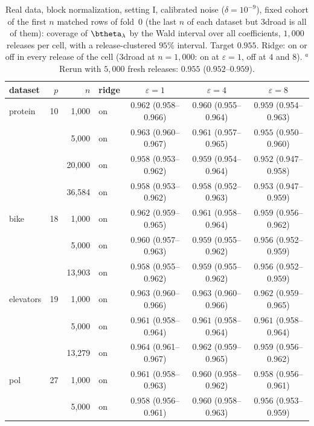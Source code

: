 \begin{table}[ht]
  \centering\small
  \caption{Real data, block normalization, setting I, calibrated noise ($\delta = 10^{-9}$), fixed cohort of the first $n$ matched rows of fold~0 (the last $n$ of each dataset but 3droad is all of them): coverage of $\btheta_\lambda$ by the Wald interval over all coefficients, $1{,}000$ releases per cell, with a release-clustered $95\%$ interval. Target $0.955$. Ridge: on or off in every release of the cell (3droad at $n = 1{,}000$: on at $\varepsilon = 1$, off at $4$ and $8$). $^{a}$Rerun with $5{,}000$ fresh releases: $0.955$ ($0.952$--$0.959$).}
  \label{tab:coverage_real}
  \footnotesize
  \setlength{\tabcolsep}{4pt}
  \begin{tabular}{@{}lrrlccc@{}}
    \toprule
    dataset & $p$ & $n$ & ridge & $\varepsilon = 1$ & $\varepsilon = 4$ & $\varepsilon = 8$ \\
    \midrule
    protein & 10 & 1{,}000 & on & $0.962$ (0.958--0.966) & $0.960$ (0.955--0.964) & $0.959$ (0.954--0.963) \\
     & & 5{,}000 & on & $0.963$ (0.960--0.967) & $0.961$ (0.957--0.965) & $0.955$ (0.950--0.960) \\
     & & 20{,}000 & on & $0.958$ (0.953--0.962) & $0.959$ (0.954--0.964) & $0.952$ (0.947--0.958) \\
     & & 36{,}584 & on & $0.958$ (0.953--0.962) & $0.958$ (0.952--0.963) & $0.953$ (0.947--0.959) \\
    \addlinespace
    bike & 18 & 1{,}000 & on & $0.962$ (0.959--0.965) & $0.961$ (0.958--0.964) & $0.959$ (0.956--0.962) \\
     & & 5{,}000 & on & $0.960$ (0.957--0.963) & $0.959$ (0.955--0.962) & $0.956$ (0.952--0.959) \\
     & & 13{,}903 & on & $0.958$ (0.955--0.962) & $0.959$ (0.955--0.962) & $0.956$ (0.952--0.959) \\
    \addlinespace
    elevators & 19 & 1{,}000 & on & $0.963$ (0.960--0.966) & $0.963$ (0.960--0.966) & $0.962$ (0.959--0.965) \\
     & & 5{,}000 & on & $0.961$ (0.958--0.964) & $0.961$ (0.958--0.964) & $0.961$ (0.958--0.964) \\
     & & 13{,}279 & on & $0.964$ (0.961--0.967) & $0.962$ (0.959--0.965) & $0.959$ (0.956--0.962) \\
    \addlinespace
    pol & 27 & 1{,}000 & on & $0.961$ (0.958--0.963) & $0.960$ (0.958--0.962) & $0.958$ (0.956--0.961) \\
     & & 5{,}000 & on & $0.958$ (0.956--0.961) & $0.960$ (0.958--0.963) & $0.956$ (0.953--0.959) \\

\end{tabular}
\end{table}
